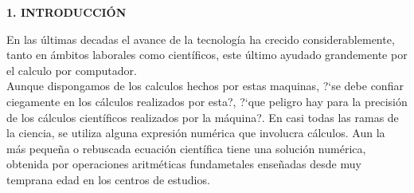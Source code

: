 \documentclass[10pt,a4paper]{article}
\begin{document}
\begin{multicols}{2}
\begin{center}
{\large \bf 1. INTRODUCCI\'ON}
\end{center}
En las \'ultimas decadas el avance de la tecnolog\'ia ha crecido considerablemente, tanto en \'ambitos laborales como cient\'ificos, este \'ultimo ayudado grandemente por el calculo por computador.\\
Aunque dispongamos de los calculos hechos por estas maquinas, ?`se debe confiar ciegamente en los c\'alculos realizados por esta?, ?`que peligro hay para la precisi\'on de los c\'alculos cient\'ificos realizados por la m\'aquina?. En casi todas las ramas de la ciencia, se utiliza alguna expresi\'on num\'erica que involucra c\'alculos. Aun la m\'as peque\~na o rebuscada ecuaci\'on cient\'ifica tiene una soluci\'on num\'erica, obtenida por operaciones aritm\'eticas fundametales ense\~nadas desde muy temprana edad en los centros de estudios.


\end{multicols}
\end{document}
